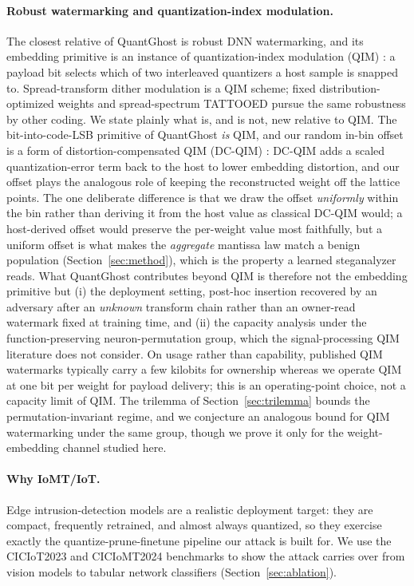 \documentclass[10pt,journal]{IEEEtran}
\theoremstyle{remark}
\newcommand{\sys}{\mbox{QuantGhost}}
\begin{document}
\paragraph{Robust watermarking and quantization-index modulation.} The closest relative
of \sys{} is robust DNN watermarking, and its embedding primitive is an instance of
quantization-index modulation (QIM) \cite{chen2001qim}: a payload bit selects which of two
interleaved quantizers a host sample is snapped to. Spread-transform dither modulation
\cite{li2021stdm} is a QIM scheme; fixed distribution-optimized weights
\cite{tondi2022robust} and spread-spectrum TATTOOED \cite{pagnotta2022tattooed} pursue the
same robustness by other coding. We state plainly what is, and is not, new relative to QIM.
The bit-into-code-LSB primitive of \sys{} \emph{is} QIM, and our random in-bin offset is a
form of distortion-compensated QIM (DC-QIM) \cite{chen2001qim}: DC-QIM adds a scaled
quantization-error term back to the host to lower embedding distortion, and our offset plays
the analogous role of keeping the reconstructed weight off the lattice points. The one
deliberate difference is that we draw the offset \emph{uniformly} within the bin rather than
deriving it from the host value as classical DC-QIM would; a host-derived offset would
preserve the per-weight value most faithfully, but a uniform offset is what makes the
\emph{aggregate} mantissa law match a benign population (Section~\ref{sec:method}), which is
the property a learned steganalyzer reads. What \sys{} contributes beyond QIM is therefore
not the embedding primitive but (i) the deployment setting, post-hoc insertion recovered by
an adversary after an \emph{unknown} transform chain rather than an owner-read watermark fixed
at training time, and (ii) the capacity analysis under the function-preserving neuron-permutation
group, which the signal-processing QIM literature does not consider. On usage rather than
capability, published QIM watermarks typically carry a few kilobits for ownership whereas we
operate QIM at one bit per weight for payload delivery; this is an operating-point choice, not
a capacity limit of QIM. The trilemma of Section~\ref{sec:trilemma} bounds the
permutation-invariant regime, and we conjecture an analogous bound for QIM watermarking under
the same group, though we prove it only for the weight-embedding channel studied here.

\paragraph{Why IoMT/IoT.} Edge intrusion-detection models are a realistic deployment
target: they are compact, frequently retrained, and almost always quantized, so they
exercise exactly the quantize-prune-finetune pipeline our attack is built for. We use the
CICIoT2023 \cite{neto2023ciciot2023} and CICIoMT2024 \cite{dadkhah2024ciciomt2024}
benchmarks to show the attack carries over from vision models to tabular network
classifiers (Section~\ref{sec:ablation}).
\end{document}
